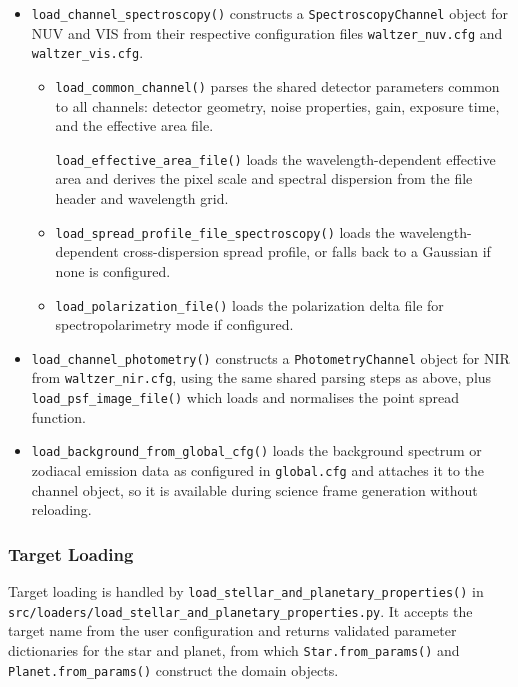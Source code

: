 \begin{itemize}
    \item \texttt{load\_channel\_spectroscopy()} constructs a \texttt{SpectroscopyChannel} object for NUV and VIS from their respective configuration files \texttt{waltzer\_nuv.cfg} and \texttt{waltzer\_vis.cfg}.
          \begin{itemize}
              \item \texttt{load\_common\_channel()} parses the shared detector parameters common to all channels: detector geometry, noise properties, gain, exposure time, and the effective area file.

                    \texttt{load\_effective\_area\_file()} loads the wavelength-dependent effective area and derives the pixel scale and spectral dispersion from the file header and wavelength grid.

              \item \texttt{load\_spread\_profile\_file\_spectroscopy()} loads the wavelength-dependent cross-dispersion spread profile, or falls back to a Gaussian if none is configured.
              \item \texttt{load\_polarization\_file()} loads the polarization delta file for spectropolarimetry mode if configured.
          \end{itemize}

    \item \texttt{load\_channel\_photometry()} constructs a \texttt{PhotometryChannel} object for NIR from \texttt{waltzer\_nir.cfg}, using the same shared parsing steps as above, plus \texttt{load\_psf\_image\_file()} which loads and normalises the point spread function.

    \item \texttt{load\_background\_from\_global\_cfg()} loads the background spectrum or zodiacal emission data as configured in \texttt{global.cfg} and attaches it to the channel object, so it is available during science frame generation without reloading.
\end{itemize}

\subsubsection{Target Loading}
\label{sec:target_loading}

Target loading is handled by \texttt{load\_stellar\_and\_planetary\_properties()} in \texttt{src/loaders/load\_stellar\_and\allowbreak\_planetary\_properties.py}. It accepts the target name from the user configuration and returns validated parameter dictionaries for the star and planet, from which \texttt{Star.from\_params()} and \texttt{Planet.from\_params()} construct the domain objects.

